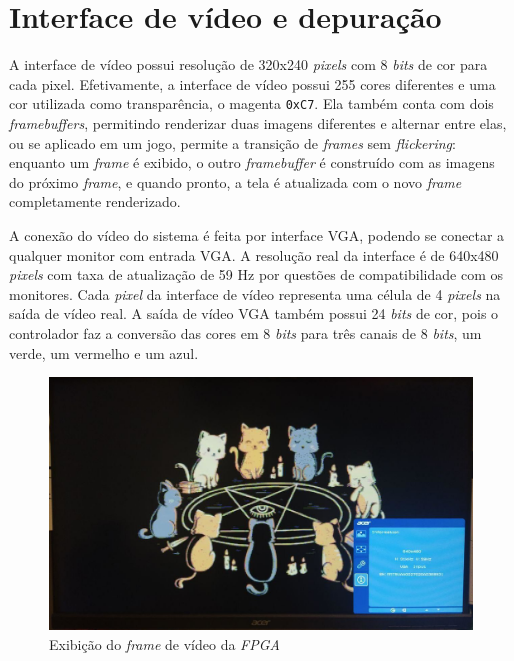     \section{Interface de vídeo e depuração}
    { A interface de vídeo possui resolução de 320x240 \textit{pixels} com 8
        \textit{bits} de cor para cada pixel. Efetivamente, a interface de vídeo
        possui 255 cores diferentes e uma cor utilizada como transparência, o
        magenta \texttt{0xC7}. Ela também conta com dois \textit{framebuffers},
        permitindo renderizar duas imagens diferentes e alternar entre elas, ou
        se aplicado em um jogo, permite a transição de \textit{frames} sem
        \textit{flickering}: enquanto um \textit{frame} é exibido, o outro
        \textit{framebuffer} é construído com as imagens do próximo \textit{frame},
        e quando pronto, a tela é atualizada com o novo \textit{frame}
        completamente renderizado.
    }

    { A conexão do vídeo do sistema é feita por interface VGA, podendo se
        conectar a qualquer monitor com entrada VGA. A resolução real da
        interface é de 640x480 \textit{pixels} com taxa de atualização de 59 Hz
        por questões de compatibilidade com os monitores. Cada \textit{pixel}
        da interface de vídeo representa uma célula de 4 \textit{pixels} na
        saída de vídeo real. A saída de vídeo VGA também possui 24 \textit{bits}
        de cor, pois o controlador faz a conversão das cores em 8 \textit{bits}
        para três canais de 8 \textit{bits}, um verde, um vermelho e um azul.
    }
    \begin{figure}[H]
    \centering
        \includegraphics[width=.9\linewidth]{../images/osd/display.jpg}
        \caption{Exibição do \textit{frame} de vídeo da \textit{FPGA}}
        \label{fig:display_cats}
    \end{figure}

